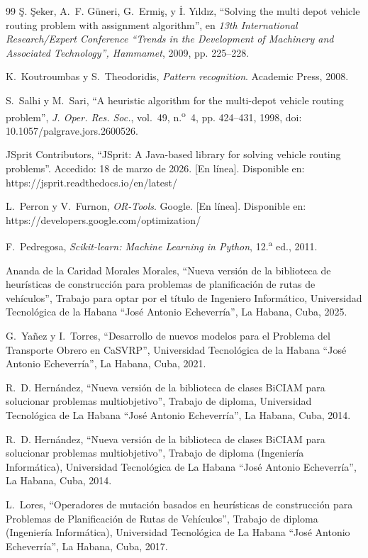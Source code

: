 \begin{thebibliography}{99}
 \c{S}. \c{S}eker, A.~F. G\"uneri, G.~Ermi\c{s}, y \.{I}. Y{\i}ld{\i}z, ``Solving the multi depot vehicle routing problem with assignment algorithm'', en \emph{13th International Research/Expert Conference ``Trends in the Development of Machinery and Associated Technology'', Hammamet}, 2009, pp. 225--228.

 K.~Koutroumbas y S.~Theodoridis, \emph{Pattern recognition}. Academic Press, 2008.

 S.~Salhi y M.~Sari, ``A heuristic algorithm for the multi-depot vehicle routing problem'', \emph{J. Oper. Res. Soc.}, vol.~49, n.\textsuperscript{o}~4, pp. 424--431, 1998, doi: 10.1057/palgrave.jors.2600526.

 JSprit Contributors, ``JSprit: A Java-based library for solving vehicle routing problems''. Accedido: 18 de marzo de 2026. [En l\'inea]. Disponible en: https://jsprit.readthedocs.io/en/latest/

 L.~Perron y V.~Furnon, \emph{OR-Tools}. Google. [En l\'inea]. Disponible en: https://developers.google.com/optimization/

 F.~Pedregosa, \emph{Scikit-learn: Machine Learning in Python}, 12.\textsuperscript{a} ed., 2011.

 Ananda de la Caridad Morales Morales, ``Nueva versi\'on de la biblioteca de heur\'isticas de construcci\'on para problemas de planificaci\'on de rutas de veh\'iculos'', Trabajo para optar por el t\'itulo de Ingeniero Inform\'atico, Universidad Tecnol\'ogica de la Habana ``Jos\'e Antonio Echeverr\'ia'', La Habana, Cuba, 2025.

 G.~Ya\~nez y I.~Torres, ``Desarrollo de nuevos modelos para el Problema del Transporte Obrero en CaSVRP'', Universidad Tecnol\'ogica de la Habana ``Jos\'e Antonio Echeverr\'ia'', La Habana, Cuba, 2021.

 R.~D. Hern\'andez, ``Nueva versi\'on de la biblioteca de clases BiCIAM para solucionar problemas multiobjetivo'', Trabajo de diploma, Universidad Tecnol\'ogica de La Habana ``Jos\'e Antonio Echeverr\'ia'', La Habana, Cuba, 2014.

 R.~D. Hern\'andez, ``Nueva versi\'on de la biblioteca de clases BiCIAM para solucionar problemas multiobjetivo'', Trabajo de diploma (Ingenier\'ia Inform\'atica), Universidad Tecnol\'ogica de La Habana ``Jos\'e Antonio Echeverr\'ia'', La Habana, Cuba, 2014.

 L.~Lores, ``Operadores de mutaci\'on basados en heur\'isticas de construcci\'on para Problemas de Planificaci\'on de Rutas de Veh\'iculos'', Trabajo de diploma (Ingenier\'ia Inform\'atica), Universidad Tecnol\'ogica de La Habana ``Jos\'e Antonio Echeverr\'ia'', La Habana, Cuba, 2017.


\end{thebibliography}
